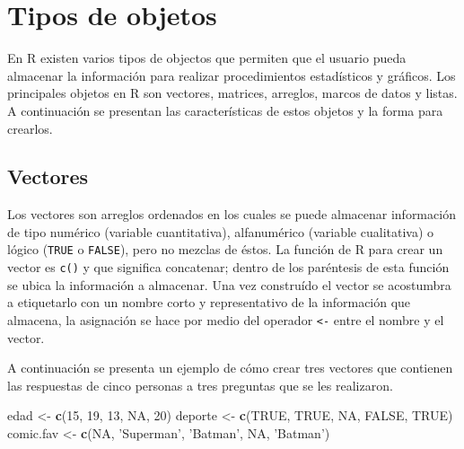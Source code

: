 \documentclass[10pt,]{krantz}
\makeatletter
\newenvironment{Shaded}{\begin{snugshade}}{\end{snugshade}}
\newcommand{\KeywordTok}[1]{\textcolor[rgb]{0.13,0.29,0.53}{\textbf{#1}}}
\newcommand{\DecValTok}[1]{\textcolor[rgb]{0.00,0.00,0.81}{#1}}
\newcommand{\StringTok}[1]{\textcolor[rgb]{0.31,0.60,0.02}{#1}}
\newcommand{\OtherTok}[1]{\textcolor[rgb]{0.56,0.35,0.01}{#1}}
\newcommand{\NormalTok}[1]{#1}
\let\proglang=\textsf
\newenvironment{kframe}{%
\medskip{}
\setlength{\fboxsep}{.8em}
 \def\at@end@of@kframe{}%
 \ifinner\ifhmode%
  \def\at@end@of@kframe{\end{minipage}}%
  \begin{minipage}{\columnwidth}%
 \fi\fi%
 \def\FrameCommand##1{\hskip\@totalleftmargin \hskip-\fboxsep
 \colorbox{shadecolor}{##1}\hskip-\fboxsep
     \hskip-\linewidth \hskip-\@totalleftmargin \hskip\columnwidth}%
 \MakeFramed {\advance\hsize-\width
   \@totalleftmargin\z@ \linewidth\hsize
   \@setminipage}}%
 {\par\unskip\endMakeFramed%
 \at@end@of@kframe}
\renewenvironment{Shaded}{\begin{kframe}}{\end{kframe}}
\makeatother
\begin{document}
\section{Tipos de objetos} \label{sec:objetos}

En \proglang{R} existen varios tipos de objectos  que
permiten que el usuario pueda almacenar la información para realizar
procedimientos estadísticos y gráficos. Los principales objetos en
\proglang{R} son vectores, matrices, arreglos, marcos de datos y listas.
A continuación se presentan las características de estos objetos y la
forma para crearlos.

\subsection{Vectores}

Los vectores  son arreglos ordenados en los cuales se
puede almacenar información de tipo numérico (variable cuantitativa),
alfanumérico (variable cualitativa) o lógico (\texttt{TRUE} o
\texttt{FALSE}), pero no mezclas de éstos. La función de \proglang{R}
para crear un vector es \texttt{c()} y que significa concatenar; dentro
de los paréntesis de esta función se ubica la información a almacenar.
Una vez construído el vector se acostumbra a etiquetarlo con un nombre
corto y representativo de la información que almacena, la asignación se
hace por medio del operador \texttt{\textless{}-} entre el nombre y el
vector.

A continuación se presenta un ejemplo de cómo crear tres vectores que
contienen las respuestas de cinco personas a tres preguntas que se les
realizaron.

\begin{Shaded}
\begin{Highlighting}[]
\NormalTok{edad <-}\StringTok{ }\KeywordTok{c}\NormalTok{(}\DecValTok{15}\NormalTok{, }\DecValTok{19}\NormalTok{, }\DecValTok{13}\NormalTok{, }\OtherTok{NA}\NormalTok{, }\DecValTok{20}\NormalTok{)}
\NormalTok{deporte <-}\StringTok{ }\KeywordTok{c}\NormalTok{(}\OtherTok{TRUE}\NormalTok{, }\OtherTok{TRUE}\NormalTok{, }\OtherTok{NA}\NormalTok{, }\OtherTok{FALSE}\NormalTok{, }\OtherTok{TRUE}\NormalTok{)}
\NormalTok{comic.fav <-}\StringTok{ }\KeywordTok{c}\NormalTok{(}\OtherTok{NA}\NormalTok{, }\StringTok{'Superman'}\NormalTok{, }\StringTok{'Batman'}\NormalTok{, }\OtherTok{NA}\NormalTok{, }\StringTok{'Batman'}\NormalTok{)}
\end{Highlighting}
\end{Shaded}
\end{document}
